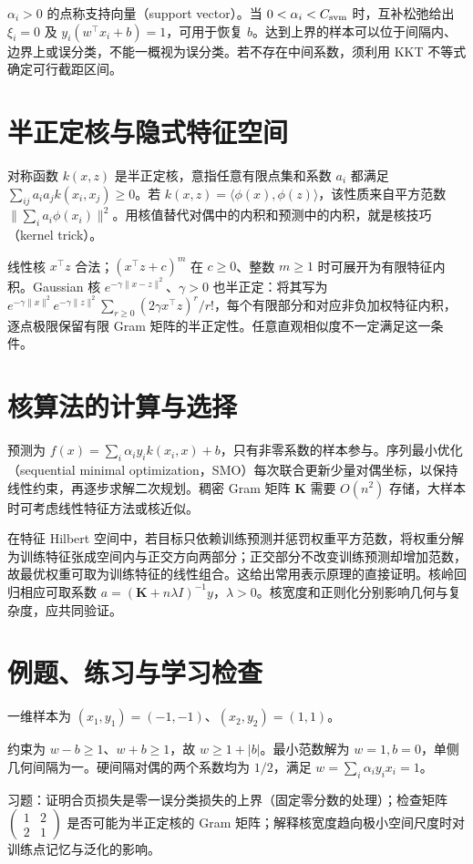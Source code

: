 $\alpha_i>0$ 的点称支持向量（support vector）。当 $0<\alpha_i<C_{\rm svm}$ 时，互补松弛给出 $\xi_i=0$ 及 $y_i(w^\top x_i+b)=1$，可用于恢复 $b$。达到上界的样本可以位于间隔内、边界上或误分类，不能一概视为误分类。若不存在中间系数，须利用 KKT 不等式确定可行截距区间。

\section{半正定核与隐式特征空间}

对称函数 $k(x,z)$ 是半正定核，意指任意有限点集和系数 $a_i$ 都满足 $\sum_{ij}a_ia_jk(x_i,x_j)\geq0$。若 $k(x,z)=\langle\phi(x),\phi(z)\rangle$，该性质来自平方范数 $\|\sum_i a_i\phi(x_i)\|^2$。用核值替代对偶中的内积和预测中的内积，就是核技巧（kernel trick）。

线性核 $x^\top z$ 合法；$(x^\top z+c)^m$ 在 $c\geq0$、整数 $m\geq1$ 时可展开为有限特征内积。Gaussian 核 $e^{-\gamma\|x-z\|^2}$、$\gamma>0$ 也半正定：将其写为 $e^{-\gamma\|x\|^2}e^{-\gamma\|z\|^2}\sum_{r\geq0}(2\gamma x^\top z)^r/r!$，每个有限部分和对应非负加权特征内积，逐点极限保留有限 Gram 矩阵的半正定性。任意直观相似度不一定满足这一条件。

\section{核算法的计算与选择}

预测为 $f(x)=\sum_i\alpha_iy_ik(x_i,x)+b$，只有非零系数的样本参与。序列最小优化（sequential minimal optimization，SMO）每次联合更新少量对偶坐标，以保持线性约束，再逐步求解二次规划。稠密 Gram 矩阵 $\mathbf K$ 需要 $O(n^2)$ 存储，大样本时可考虑线性特征方法或核近似。

在特征 Hilbert 空间中，若目标只依赖训练预测并惩罚权重平方范数，将权重分解为训练特征张成空间内与正交方向两部分；正交部分不改变训练预测却增加范数，故最优权重可取为训练特征的线性组合。这给出常用表示原理的直接证明。核岭回归相应可取系数 $a=(\mathbf K+n\lambda I)^{-1}y$，$\lambda>0$。核宽度和正则化分别影响几何与复杂度，应共同验证。

\section{例题、练习与学习检查}

\begin{example}[两个点的最大间隔]
一维样本为 $(x_1,y_1)=(-1,-1)$、$(x_2,y_2)=(1,1)$。
\end{example}
\begin{solve}
约束为 $w-b\geq1$、$w+b\geq1$，故 $w\geq1+|b|$。最小范数解为 $w=1,b=0$，单侧几何间隔为一。硬间隔对偶的两个系数均为 $1/2$，满足 $w=\sum_i\alpha_iy_ix_i=1$。
\end{solve}

习题：证明合页损失是零一误分类损失的上界（固定零分数的处理）；检查矩阵 $\left(\begin{smallmatrix}1&2\\2&1\end{smallmatrix}\right)$ 是否可能为半正定核的 Gram 矩阵；解释核宽度趋向极小空间尺度时对训练点记忆与泛化的影响。




